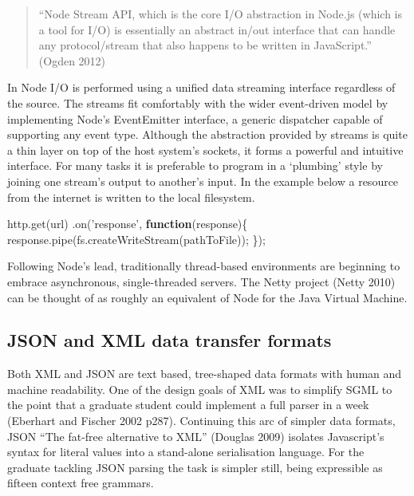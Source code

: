 \documentclass[12pt, ]{article}
\newenvironment{Shaded}{}{}
\newcommand{\KeywordTok}[1]{\textcolor[rgb]{0.00,0.44,0.13}{\textbf{{#1}}}}
\newcommand{\StringTok}[1]{\textcolor[rgb]{0.25,0.44,0.63}{{#1}}}
\newcommand{\OtherTok}[1]{\textcolor[rgb]{0.00,0.44,0.13}{{#1}}}
\newcommand{\FunctionTok}[1]{\textcolor[rgb]{0.02,0.16,0.49}{{#1}}}
\newcommand{\NormalTok}[1]{{#1}}
\begin{document}
\begin{quote}
``Node Stream API, which is the core I/O abstraction in Node.js (which
is a tool for I/O) is essentially an abstract in/out interface that can
handle any protocol/stream that also happens to be written in
JavaScript.'' (Ogden 2012)
\end{quote}

In Node I/O is performed using a unified data streaming interface
regardless of the source. The streams fit comfortably with the wider
event-driven model by implementing Node's EventEmitter interface, a
generic dispatcher capable of supporting any event type. Although the
abstraction provided by streams is quite a thin layer on top of the host
system's sockets, it forms a powerful and intuitive interface. For many
tasks it is preferable to program in a `plumbing' style by joining one
stream's output to another's input. In the example below a resource from
the internet is written to the local filesystem.

\begin{Shaded}
\begin{Highlighting}[]
\OtherTok{http}\NormalTok{.}\FunctionTok{get}\NormalTok{(url)}
   \NormalTok{.}\FunctionTok{on}\NormalTok{(}\StringTok{'response'}\NormalTok{, }\KeywordTok{function}\NormalTok{(response)\{}
      \OtherTok{response}\NormalTok{.}\FunctionTok{pipe}\NormalTok{(}\OtherTok{fs}\NormalTok{.}\FunctionTok{createWriteStream}\NormalTok{(pathToFile));}
   \NormalTok{\});}
\end{Highlighting}
\end{Shaded}

Following Node's lead, traditionally thread-based environments are
beginning to embrace asynchronous, single-threaded servers. The Netty
project (Netty 2010) can be thought of as roughly an equivalent of Node
for the Java Virtual Machine.

\subsection{JSON and XML data transfer formats}\label{jsonxml}

Both XML and JSON are text based, tree-shaped data formats with human
and machine readability. One of the design goals of XML was to simplify
SGML to the point that a graduate student could implement a full parser
in a week (Eberhart and Fischer 2002 p287). Continuing this arc of
simpler data formats, JSON ``The fat-free alternative to XML'' (Douglas
2009) isolates Javascript's syntax for literal values into a stand-alone
serialisation language. For the graduate tackling JSON parsing the task
is simpler still, being expressible as fifteen context free grammars.
\end{document}
